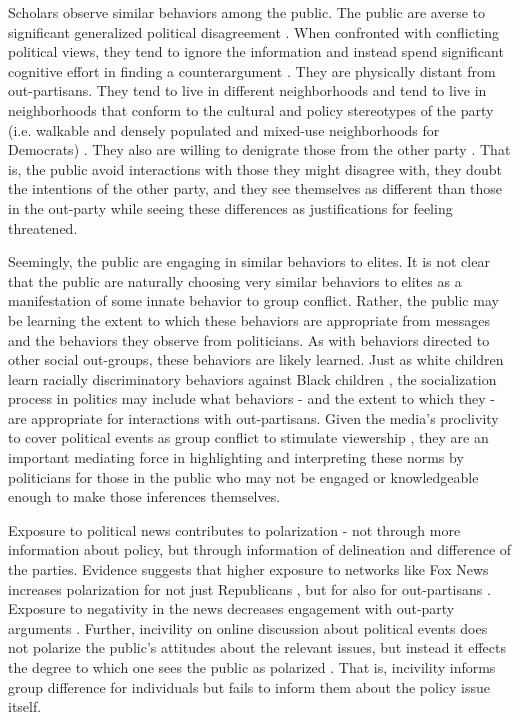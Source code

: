 \documentclass [12pt]{article}
\begin{document}
Scholars observe similar behaviors among the public. The public are averse to significant generalized political disagreement \citep{klar_krupnikov_2016}. When confronted with conflicting political views, they tend to ignore the information and instead spend significant cognitive effort in finding a counterargument \citep{taber_lodge_2006}. They are physically distant from out-partisans. They tend to live in different neighborhoods and tend to live in neighborhoods that conform to the cultural and policy stereotypes of the party (i.e. walkable and densely populated and mixed-use neighborhoods for Democrats) \citep{liu_et-al_2019, lyons_utych_2021}. They also are willing to denigrate those from the other party \citep{iyengar_westwood_2015}. That is, the public avoid interactions with those they might disagree with, they doubt the intentions of the other party, and they see themselves as different than those in the out-party while seeing these differences as justifications for feeling threatened. 

Seemingly, the public are engaging in similar behaviors to elites. It is not clear that the public are naturally choosing very similar behaviors to elites as a manifestation of some innate behavior to group conflict. Rather, the public may be learning the extent to which these behaviors are appropriate from messages and the behaviors they observe from politicians. As with behaviors directed to other social out-groups, these behaviors are likely learned. Just as white children learn racially discriminatory behaviors against Black children \citep[see][]{sears_brown_2013}, the socialization process in politics may include what behaviors - and the extent to which they - are appropriate for interactions with out-partisans. Given the media's proclivity to cover political events as group conflict to stimulate viewership \citep{baum_jamieson_2006}, they are an important mediating force in highlighting and interpreting these norms by politicians for those in the public who may not be engaged or knowledgeable enough to make those inferences themselves.

Exposure to political news contributes to polarization - not through more information about policy, but through information of delineation and difference of the parties. Evidence suggests that higher exposure to networks like Fox News increases polarization for not just Republicans \citep{licari_2020}, but for also for out-partisans \citep{webster_abramowitz_2017}. Exposure to negativity in the news decreases engagement with out-party arguments \citep{muddiman_et-al_2020}. Further, incivility on online discussion about political events does not polarize the public's attitudes about the relevant issues, but instead it effects the degree to which one sees the public as polarized \citep{hwang_et-al_2014}. That is, incivility informs group difference for individuals but fails to inform them about the policy issue itself.
\end{document}
